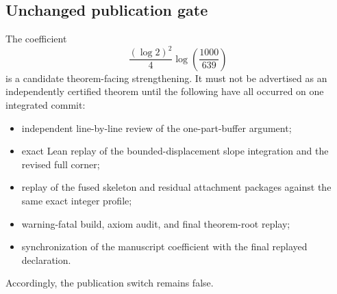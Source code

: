 \subsection{Unchanged publication gate}

The coefficient
\[
  \frac{(\log 2)^2}{4}
  \log\!\left(\frac{1000}{639}\right)
\]
is a candidate theorem-facing strengthening. It must not be advertised as an
independently certified theorem until the following have all occurred on one
integrated commit:
\begin{itemize}
\item independent line-by-line review of the one-part-buffer argument;
\item exact Lean replay of the bounded-displacement slope integration and the
revised full corner;
\item replay of the fused skeleton and residual attachment packages against the
same exact integer profile;
\item warning-fatal build, axiom audit, and final theorem-root replay;
\item synchronization of the manuscript coefficient with the final replayed
declaration.
\end{itemize}
Accordingly, the publication switch remains false.
